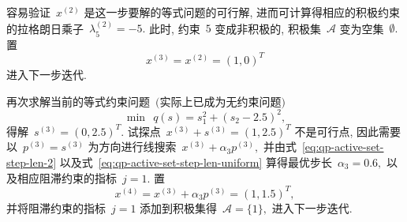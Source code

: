 \begin{exam}
容易验证~${x}^{(2)}$ 是这一步要解的等式问题的可行解, 进而可计算得相应的积极约束的拉格朗日乘子~$\lambda_5^{(2)} = -5.$ 此时, 约束~$5$ 变成非积极的, 积极集~$\mathcal{A}$ 变为空集~$\emptyset.$ 置
\begin{equation*}
{x}^{(3)} = {x}^{(2)} = (1, 0)^T
\end{equation*}
进入下一步迭代.

再次求解当前的等式约束问题~$($实际上已成为无约束问题$)$
\begin{equation*}
\min ~~ q({s}) = s_1^2 + (s_2 - 2.5)^2,
\end{equation*}
得解~${s}^{(3)} = (0, 2.5)^T.$ 试探点~${x}^{(3)} + {s}^{(3)} = (1, 2.5)^T$ 不是可行点,
因此需要以~${p}^{(3)} = {s}^{(3)}$ 为方向进行线搜索~${x}^{(3)} + \alpha_3 {p}^{(3)},$
并由式~\eqref{eq:qp-active-set-step-len-2} 以及式~\eqref{eq:qp-active-set-step-len-uniform} 算得最优步长~$\alpha_3 = 0.6,$ 以及相应阻滞约束的指标~$j = 1.$ 置
\begin{equation*}
{x}^{(4)} = {x}^{(3)} + \alpha_3 {p}^{(3)} = (1, 1.5)^T,
\end{equation*}
并将阻滞约束的指标~$j = 1$ 添加到积极集得~$\mathcal{A} = \{ 1 \},$ 进入下一步迭代.


\end{exam}
